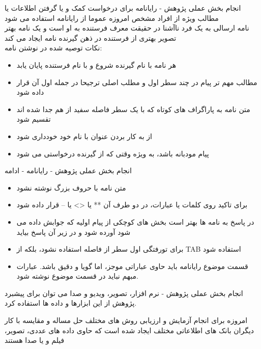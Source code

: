 \documentclass[14pt]{beamer}
\makeatletter
\newcommand{\rtlist}{\raggedleft\rightskip\@totalleftmargin}
\newcommand{\framefontsizelarge}{\fontsize{18pt}{0pt}\selectfont}
\newcommand{\frametitlefontsize}{\fontsize{20pt}{0pt}\selectfont}
\newcommand{\defaultvspace}{\vspace{5mm}}
\makeatother
\begin{document}
\begin{persian}
	\begin{frame}{\frametitlefontsize  انجام بخش عملی پژوهش - رایانامه }
		\framefontsizelarge
		برای درخواست کمک و یا گرفتن اطلاعات یا مطالب ویژه از افراد مشخص امروزه عموما از رایانامه استفاده می شود\\
		نامه ارسالی به یک فرد ناآشنا در حقیقت معرف فرستنده به او است و یک نامه بهتر تصویر بهتری از فرستنده در ذهن گیرنده نامه ایجاد می کند\defaultvspace\\
		نکات توصیه شده در نوشتن نامه:
		\begin{itemize}\rtlist
			\item هر نامه با نام گیرنده شروع و با نام فرستنده پایان یابد
			\item مطالب مهم تر پیام در چند سطر اول و مطلب اصلی ترجیحا در جمله اول آن قرار داده شود
			\item متن نامه به پاراگراف های کوتاه که با یک سطر فاصله سفید از هم جدا شده اند تقسیم شود
			\item از به کار بردن عنوان با نام خود خودداری شود
			\item پیام مودبانه باشد، به ویژه وقتی که از گیرنده درخواستی می شود
		\end{itemize}
	\end{frame}
	
	\begin{frame}{\frametitlefontsize  انجام بخش عملی پژوهش - رایانامه - ادامه }
		\framefontsizelarge
		\begin{itemize}\rtlist
			\item متن نامه با حروف بزرگ نوشته نشود
			\item برای تاکید روی کلمات یا عبارات، در دو طرف آن ** یا <> یا -- قرار داده شود
			\item در پاسخ به نامه ها بهتر است بخش های کوچکی از پیام اولیه که جوابش داده می شود آورده شود و در زیر آن پاسخ بیاید
			\item برای تورفتگی اول سطر از فاصله استفاده نشود، بلکه از TAB استفاده شود
			\item قسمت موضوع رایانامه باید حاوی عباراتی موجز، اما گویا و دقیق باشد. عبارات مبهم نباید در قسمت موضوع نوشته شود.
		\end{itemize}
	\end{frame}
	
	\begin{frame}{\frametitlefontsize  انجام بخش عملی پژوهش - نرم افزار، تصویر، ویدیو و صدا }
		\framefontsizelarge
		می توان برای پیشبرد پژوهش از این ابزارها و داده ها استفاده کرد. 
		
		امروزه برای انجام آزمایش و ارزیابی روش های مختلف حل مساله و مقایسه با کار دیگران بانک های اطلاعاتی مختلف ایجاد شده است که حاوی داده های عددی، تصویر، فیلم و یا صدا هستند
	\end{frame}
	

\end{persian}
\end{document}
